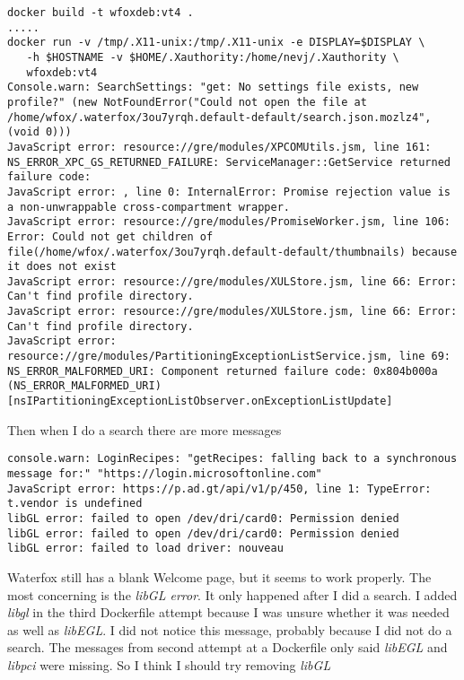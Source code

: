 \documentclass[a4paper]{article}  %
\begin{document}
\begin{tcolorbox}
\begin{verbatim}
docker build -t wfoxdeb:vt4 .
.....
docker run -v /tmp/.X11-unix:/tmp/.X11-unix -e DISPLAY=$DISPLAY \
   -h $HOSTNAME -v $HOME/.Xauthority:/home/nevj/.Xauthority \
   wfoxdeb:vt4
Console.warn: SearchSettings: "get: No settings file exists, new profile?" (new NotFoundError("Could not open the file at /home/wfox/.waterfox/3ou7yrqh.default-default/search.json.mozlz4", (void 0)))
JavaScript error: resource://gre/modules/XPCOMUtils.jsm, line 161: NS_ERROR_XPC_GS_RETURNED_FAILURE: ServiceManager::GetService returned failure code:
JavaScript error: , line 0: InternalError: Promise rejection value is a non-unwrappable cross-compartment wrapper.
JavaScript error: resource://gre/modules/PromiseWorker.jsm, line 106: Error: Could not get children of file(/home/wfox/.waterfox/3ou7yrqh.default-default/thumbnails) because it does not exist
JavaScript error: resource://gre/modules/XULStore.jsm, line 66: Error: Can't find profile directory.
JavaScript error: resource://gre/modules/XULStore.jsm, line 66: Error: Can't find profile directory.
JavaScript error: resource://gre/modules/PartitioningExceptionListService.jsm, line 69: NS_ERROR_MALFORMED_URI: Component returned failure code: 0x804b000a (NS_ERROR_MALFORMED_URI) [nsIPartitioningExceptionListObserver.onExceptionListUpdate]
\end{verbatim}
\end{tcolorbox}

Then when I do a search there are more messages
\begin{tcolorbox}
\begin{verbatim}
console.warn: LoginRecipes: "getRecipes: falling back to a synchronous message for:" "https://login.microsoftonline.com"
JavaScript error: https://p.ad.gt/api/v1/p/450, line 1: TypeError: t.vendor is undefined
libGL error: failed to open /dev/dri/card0: Permission denied
libGL error: failed to open /dev/dri/card0: Permission denied
libGL error: failed to load driver: nouveau
\end{verbatim}
\end{tcolorbox}
Waterfox still has a blank Welcome page, but it seems to work properly.
The most concerning is the {\em libGL error}. It only happened after I did a search. 
I added {\em libgl} in the third Dockerfile attempt because I was unsure whether it was needed as well as {\em libEGL}. I did not notice this message, probably because I did not do a search.  The messages from second attempt at a Dockerfile only said {\em libEGL} and {\em libpci} were missing. So I think I should try removing {\em libGL}
\end{document}
